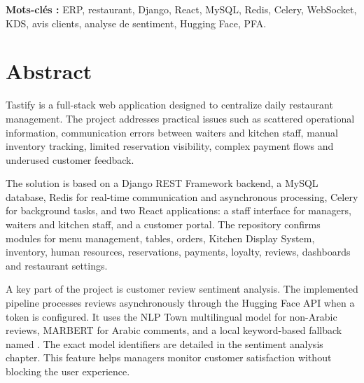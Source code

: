 \textbf{Mots-clés :} ERP, restaurant, Django, React, MySQL, Redis, Celery, WebSocket, KDS, avis clients, analyse de sentiment, Hugging Face, PFA.

\chapter*{Abstract}
Tastify is a full-stack web application designed to centralize daily restaurant management. The project addresses practical issues such as scattered operational information, communication errors between waiters and kitchen staff, manual inventory tracking, limited reservation visibility, complex payment flows and underused customer feedback.

The solution is based on a Django REST Framework backend, a MySQL database, Redis for real-time communication and asynchronous processing, Celery for background tasks, and two React applications: a staff interface for managers, waiters and kitchen staff, and a customer portal. The repository confirms modules for menu management, tables, orders, Kitchen Display System, inventory, human resources, reservations, payments, loyalty, reviews, dashboards and restaurant settings.

A key part of the project is customer review sentiment analysis. The implemented pipeline processes reviews asynchronously through the Hugging Face API when a token is configured. It uses the NLP Town multilingual model for non-Arabic reviews, MARBERT for Arabic comments, and a local keyword-based fallback named . The exact model identifiers are detailed in the sentiment analysis chapter. This feature helps managers monitor customer satisfaction without blocking the user experience.

